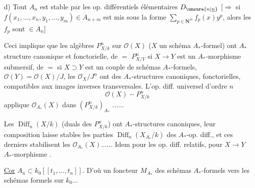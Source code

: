 d) Tout $A_n$ est stable par les op. différentiels élémentaires $D_{\unsure{n|\underline n}}$ [$\Longrightarrow$ si $f(x_1,\ldots,x_n,y_1,\ldots,y_m)\in A_{n+m}$ est mis sous la forme $\sum_{p\in\mathbf N^m}f_p(x)y^p$, alors les $f_p$ sont $\in A_n$]

Ceci implique que les algèbres $P^n_{X/k}$ sur $\mathcal O(X)$ ($X$ un  schéma $A_*$-formel) ont  $A_*$ structure canonique et fonctorielle, de $=$ $P^n_{X/Y}$ si $X\to Y$ est un $A_*$-morphisme submersif, de $=$  si $X\supset Y$ est un couple de schémas $A_*$-formels, $\mathcal O(Y)=\mathcal O(X)/J$, les  $\mathcal O_X/J^n$ ont des $A_*$-structures canoniques, fonctorielles, compatibles aux images inverses transversales. L'op. diff. universel d'ordre $n$
\[
\mathcal O(X)\mathbin{-}P^n_{X/k}
\]
 applique $\mathcal O_{A_*}(X)$ dans $(P^n_{X/k})_{A_*}$  $\ldots\ldots$

 Les $\operatorname{Diff}_n(X/k)$ (duals des $P^n_{X/k}$) ont  $A_*$-structures canoniques, leur composition  laisse stables les parties $\operatorname{Diff}_n(X_{A_*}/k)$ des $A_*$-op. diff., et ces derniers stabilisent les  $\mathcal O_{A_*}(X)\ldots\ldots$ Idem pour les op. diff. relatifs, pour $X\to Y$ $A_*$-morphisme  .

\uline{Cor} $A_n\subset k_0[[t_1,\ldots,t_n]]$.  D'où un foncteur $M_{A_*}$ des schémas $A_*$-formels vers les schémas formels sur $k_0\ldots$
